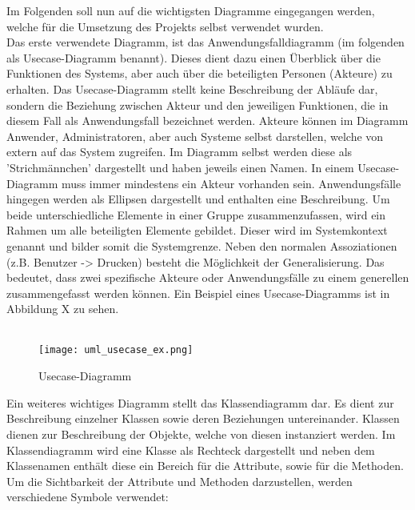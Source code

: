 Im Folgenden soll nun auf die wichtigsten Diagramme eingegangen werden, welche für die Umsetzung des Projekts selbst verwendet wurden.\\
Das erste verwendete Diagramm, ist das Anwendungsfalldiagramm (im
folgenden als Usecase-Diagramm benannt).  Dieses dient dazu einen Überblick über die Funktionen des Systems, aber auch über die beteiligten Personen (Akteure) zu erhalten. Das Usecase-Diagramm stellt keine Beschreibung der Abläufe dar, sondern die Beziehung zwischen Akteur und den jeweiligen Funktionen, die in diesem Fall als Anwendungsfall bezeichnet werden. Akteure können im Diagramm Anwender, Administratoren, aber auch Systeme selbst darstellen, welche von extern auf das System zugreifen. Im Diagramm selbst werden diese als 'Strichmännchen' dargestellt und haben jeweils einen Namen. In einem Usecase-Diagramm muss immer mindestens ein Akteur vorhanden sein.
Anwendungsfälle hingegen werden als Ellipsen dargestellt und enthalten eine Beschreibung.
Um beide unterschiedliche Elemente in einer Gruppe zusammenzufassen, wird ein Rahmen um alle beteiligten Elemente gebildet.
Dieser wird im Systemkontext genannt und bilder somit die Systemgrenze.
Neben den normalen Assoziationen (z.B. Benutzer -> Drucken) besteht die Möglichkeit der Generalisierung.
Das bedeutet, dass zwei spezifische Akteure oder Anwendungsfälle zu einem generellen zusammengefasst werden können.
Ein Beispiel eines Usecase-Diagramms ist in Abbildung X zu sehen.\\
\\
\begin{figure}[H]
\centering
\texttt{[image: uml\_usecase\_ex.png]}
\caption{Usecase-Diagramm}
\label{fig:show_s1_s2_p1_n1}
\end{figure}
Ein weiteres wichtiges Diagramm stellt das Klassendiagramm dar. Es dient zur Beschreibung einzelner Klassen sowie deren Beziehungen untereinander. Klassen dienen zur Beschreibung der Objekte, welche von diesen instanziert werden. Im Klassendiagramm wird eine Klasse als Rechteck dargestellt und neben dem Klassenamen enthält diese ein Bereich für die Attribute, sowie für die Methoden.
Um die Sichtbarkeit der Attribute und Methoden darzustellen, werden verschiedene Symbole verwendet:\\

